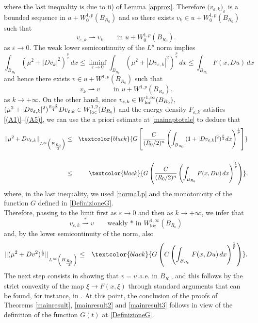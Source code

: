\documentclass[12pt]{amsart}
\theoremstyle{definition}
\numberwithin{equation}{section}
\numberwithin{equation}{section}
\begin{document}
{\[\] 
where the last inequality is due to ii) of Lemma \ref{approx}.
Therefore $\big(v_{\varepsilon,k}\big)_\varepsilon$ is a bounded sequence in $u+W^{1,p}_0(B_{R_0})$ and so there exists $v_k\in u+W^{1,p}_0(B_{R_0})$ such that \begin{equation}\label{weakLp}
  v_{\varepsilon,k} \rightharpoonup v_k \qquad \text{in}\,\, u+W^{1,p}_0(B_{R_0}).  
\end{equation}
{as $\varepsilon\to 0$.} The weak lower semicontinuity of the $L^p$ norm implies
\[
\int_{B_{R_0}}(\mu^2+|Dv_{k}|^2)^{\frac{p}{2}}\, dx\le \liminf_{\varepsilon\to 0}\int_{B_{R_0}}(\mu^2+|Dv_{\varepsilon,k}|^2)^{\frac{p}{2}}\, dx \le \int_{B_{R_0}}F (x,Du)\,dx 
\]
and hence 
there exists $v\in u+ W^{1,p}(B_{R_0})$ such that \begin{equation}\label{weakLpbis}
  v_{k} \rightharpoonup v \qquad \text{in}\,\, u+W^{1,p}(B_{R_0}).  
\end{equation}
{as $k\to +\infty$.} On the other hand, since $v_{\varepsilon,k}\in W^{1,\infty}_{\rm loc}(B_{R_0})$, $(\mu^2+|Dv_{\varepsilon,k}|^2)^{\frac{p-2}{4}}Dv_{\varepsilon,k}\in W^{1,2}_{\rm loc}(B_{R_0})$ {and the energy density $F_{\varepsilon, k}$ satisfies \eqref{(A1)}--\eqref{(A5)},} we can use the a priori estimate at \eqref{mainaptotale} to deduce that
\begin{eqnarray}\label{apriori2}
||\mu^2+Dv_{\varepsilon,k}||_{L^\infty \left (B_{\frac{R_0}{2}}\right )}&\le &  \textcolor{black}{G \left [{\frac{C}{(R_0/2)^n}}\left (\int_{B_{R_0}}  \, (1 + |Dv_{\varepsilon,k}|^2)^{\frac{p}{2}} dx \right) ^{\frac{1}{p}} \right ]}
\cr\cr 
&\le&  \textcolor{black}{G\left({\frac{C}{(R_0/2)^n}}\left(\int_{B_{R_0}}F (x,Du)\,dx\right)^{\frac{1}{p}}\right)},
\end{eqnarray}
 where, in the last inequality, we used \eqref{normaLp} and the monotonicity of the function $G$ defined in \eqref{DefinizioneG}.
 \\
Therefore, passing to the limit first as $\varepsilon\to 0$ and then as $k\to +\infty$, we infer that
\begin{equation}\label{weakLpbi}
  v_{\varepsilon,k} \stackrel{*}\rightharpoonup v \qquad \text{weakly * in}\,\, W^{1,\infty}_{\mathrm{loc}}(B_{R_0})  
\end{equation}
and, by the lower semicontinuity of the norm, also
\begin{eqnarray}\label{apriori2bis}
||(\mu^2+Dv^2)^{\frac12}||_{L^\infty \left(B_{\frac{R_0}{2}}\right )}
&\le& \textcolor{black}{G\left(C\left(\int_{B_{R_0}}F (x,Du)\,dx\right)^{\frac{1}{p}}\right)}. 
\end{eqnarray}
The next step consists in 
 showing that $v=u$ a.e. in $B_{R_0}$, and this follows by  the strict convexity of the map $\xi\to F(x,\xi)$ through standard arguments that can be found, for instance, in \cite{EMM16,CGGP,CGHPdN20}.
 At this point, the conclusion of the proofs of Theorems \ref{mainresult}, \ref{mainresult2} and \ref{mainresult3} follows in view of the definition of the function $G(t)$ at \eqref{DefinizioneG}.


}
\end{document}
